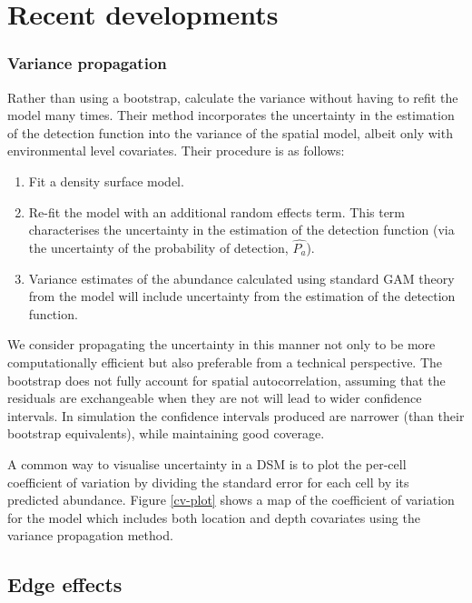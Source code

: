 \documentclass[a4paper,12pt]{article}
\begin{document}
\section*{Recent developments}
\label{s:recentadvances}

\subsubsection*{Variance propagation}

Rather than using a bootstrap, \cite{WILLIAMS:2011in} calculate the variance without having to refit the model many times.  Their method incorporates the uncertainty in the estimation of the detection function into the variance of the spatial model, albeit only with environmental level covariates. Their procedure is as follows:
\begin{enumerate}
\item Fit a density surface model.
\item Re-fit the model with an additional random effects term. This term characterises the uncertainty in the estimation of the detection function (via the uncertainty of the probability of detection, $\hat{P_a}$).
\item Variance estimates of the abundance calculated using standard GAM theory \citep[page 245]{Wood:2006wz} from the model will include uncertainty from the estimation of the detection function.
\end{enumerate}
We consider propagating the uncertainty in this manner not only to be more computationally efficient but also preferable from a technical perspective. The bootstrap does not fully account for spatial autocorrelation, assuming that the residuals are exchangeable when they are not will lead to wider confidence intervals. In simulation  the confidence intervals produced are narrower (than their bootstrap equivalents), while maintaining good coverage.

A common way to visualise uncertainty in a DSM is to plot the per-cell coefficient of variation by dividing the standard error for each cell by its predicted abundance. Figure \ref{cv-plot} shows a map of the coefficient of variation for the model which includes both location and depth covariates using the variance propagation method. 

\subsection*{Edge effects}
\label{s:leakage}
\end{document}
